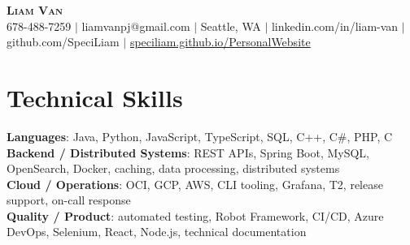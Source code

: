 \documentclass[letterpaper,11pt]{article}
\begin{document}

%
\begin{center}
    \textbf{\Huge \scshape Liam Van} \\ \vspace{1pt}
    \small 678-488-7259 $|$ \small {liamvanpj@gmail.com} $|$ Seattle, WA
 {{$|$ linkedin.com/in/liam-van} {$|$ github.com/SpeciLiam} {$|$ \href{https://speciliam.github.io/PersonalWebsite}{speciliam.github.io/PersonalWebsite}}}

\end{center}

\section{Technical Skills}
 \begin{itemize}[leftmargin=0.15in, label={}]
    \small{\item{
     \textbf{Languages}{: Java, Python, JavaScript, TypeScript, SQL, C++, C\#, PHP, C} \\
     \textbf{Backend / Distributed Systems}{: REST APIs, Spring Boot, MySQL, OpenSearch, Docker, caching, data processing, distributed systems} \\
     \textbf{Cloud / Operations}{: OCI, GCP, AWS, CLI tooling, Grafana, T2, release support, on-call response} \\
     \textbf{Quality / Product}{: automated testing, Robot Framework, CI/CD, Azure DevOps, Selenium, React, Node.js, technical documentation} \\
    }}
 \end{itemize}
%
\end{document}
